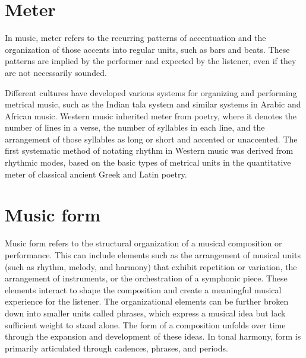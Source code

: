 \section{Meter}

In music, meter refers to the recurring patterns of accentuation and the organization of those accents into regular units, such as bars and beats. These patterns are implied by the performer and expected by the listener, even if they are not necessarily sounded.

Different cultures have developed various systems for organizing and performing metrical music, such as the Indian tala system and similar systems in Arabic and African music. Western music inherited meter from poetry, where it denotes the number of lines in a verse, the number of syllables in each line, and the arrangement of those syllables as long or short and accented or unaccented. The first systematic method of notating rhythm in Western music was derived from rhythmic modes, based on the basic types of metrical units in the quantitative meter of classical ancient Greek and Latin poetry.

\section{Music form}

Music form refers to the structural organization of a musical composition or performance. This can include elements such as the arrangement of musical units (such as rhythm, melody, and harmony) that exhibit repetition or variation, the arrangement of instruments, or the orchestration of a symphonic piece. These elements interact to shape the composition and create a meaningful musical experience for the listener. The organizational elements can be further broken down into smaller units called phrases, which express a musical idea but lack sufficient weight to stand alone. The form of a composition unfolds over time through the expansion and development of these ideas. In tonal harmony, form is primarily articulated through cadences, phrases, and periods. 